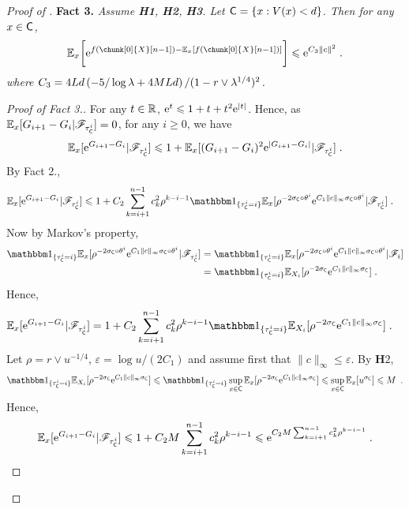 \documentclass[leqno,11pt,a4paper]{article}
\begin{document}
\begin{proof}[Proof of ]
\noindent
{\bf Fact 3.} \emph{ Assume {\bf H1}, {\bf H2}, {\bf H3}. Let $\mathsf{C} = \{x: V(x) < d\}$. Then for any $x\in \mathsf{C}$,}
\begin{align}
\Ebb_x\bigg[\rme^{f(\chunk[0]{X}[n-1])-\Ebb_x[f(\chunk[0]{X}[n-1])]}\bigg]\leqslant \rme^{C_3\|c\|^2}\eqsp.
\end{align}
\emph{where $C_3=4Ld\left(-5 / \log \lambda+4MLd\right) / (1-r\vee \lambda^{1/4})^2$.}
\begin{proof}[Proof of Fact 3.]
For any $t\in \mathbb{R}$, $\mathrm{e}^t\leqslant 1+t+t^2\mathrm{e}^{|t|}$. Hence, as $\mathbb{E}_{x}[G_{i+1}-G_i|\mathscr{F}_{\tau_{\mathsf{C}}^{i}}]=0$, for any $i\geqslant 0$, we have
\begin{align*}
 \mathbb{E}_x[\mathrm{e}^{G_{i+1}-G_i}|\mathscr{F}_{\tau_{\mathsf{C}}^{i}}]\leqslant 1+\mathbb{E}_x[(G_{i+1}-G_i)^2\mathrm{e}^{|G_{i+1}-G_i|}|\mathscr{F}_{\tau_{\mathsf{C}}^{i}}]\;.
\end{align*}
By Fact 2.,
\begin{align*}
 \Ebb_x[\rme^{G_{i+1}-G_i}|\cF_{\tau_{\cC}^{i}}]&\leqslant 1+C_2\sum_{k=i+1}^{n-1}c_k^2\rho^{k-i-1}\indiacc{\tau_{\cC}^{i}=i}\Ebb_x[\rho^{-2\sigma_{\cC}\circ\theta^{i}}\rme^{C_1\|c\|_{\infty}\sigma_{\cC}\circ\theta^{i}}|\cF_{\tau_{\cC}^{i}}]\eqsp.
 \end{align*}
 Now by Markov's property,
\begin{align*}
\indiacc{\tau_{\cC}^{i}=i} \Ebb_x[\rho^{-2\sigma_{\cC}\circ\theta^{i}}\rme^{C_1\|c\|_{\infty}\sigma_{\cC}\circ\theta^{i}}|\cF_{\tau_{\cC}^{i}}]&=\indiacc{\tau_{\cC}^{i}=i} \Ebb_x[\rho^{-2\sigma_{\cC}\circ\theta^{i}}\rme^{C_1\|c\|_{\infty}\sigma_{\cC}\circ\theta^{i}}|\cF_{i}]\\
&=\indiacc{\tau_{\cC}^{i}=i}\Ebb_{X_i}[\rho^{-2\sigma_{\cC}}\rme^{C_1\|c\|_{\infty}\sigma_{\cC}}]\eqsp.
\end{align*}
Hence,
 \begin{align*}
 \Ebb_x[\rme^{G_{i+1}-G_i}|\cF_{\tau_{\cC}^{i}}]
 &=1+C_2\sum_{k=i+1}^{n-1}c_k^2\rho^{k-i-1}\indiacc{\tau_{\cC}^{i}=i}\Ebb_{X_i}[\rho^{-2\sigma_{\cC}}\rme^{C_1\|c\|_{\infty}\sigma_{\cC}}]\eqsp.
 \end{align*}
Let $\rho=r\vee u^{-1/4}$, $\varepsilon=\log u/(2C_1)$ and assume first that $\|c\|_{\infty}\leqslant \varepsilon$. By {\bf H$2$},
\[
\indiacc{\tau_{\cC}^{i}=i}\Ebb_{X_i}[\rho^{-2\sigma_{\cC}}\rme^{C_1\|c\|_{\infty}\sigma_{\cC}}]\leqslant \indiacc{\tau_{\cC}^{i}=i}\sup_{x\in\cC}\Ebb_x[\rho^{-2\sigma_{\cC}}\rme^{C_1\|c\|_{\infty}\sigma_{\cC}}]\leqslant\sup_{x\in\cC}\Ebb_x[u^{\sigma_{\cC}}]\leqslant M\enspace.
\]
Hence,
\[
 \mathbb{E}_x[\mathrm{e}^{G_{i+1}-G_i}|\mathscr{F}_{\tau_{\mathsf{C}}^{i}}]\leqslant 1+C_2M\sum_{k=i+1}^{n-1}c_k^2\rho^{k-i-1}\leqslant \mathrm{e}^{C_2M\sum_{k=i+1}^{n-1}c_k^2\rho^{k-i-1}}\;.
\]
\end{proof}
\end{proof}
\end{document}
